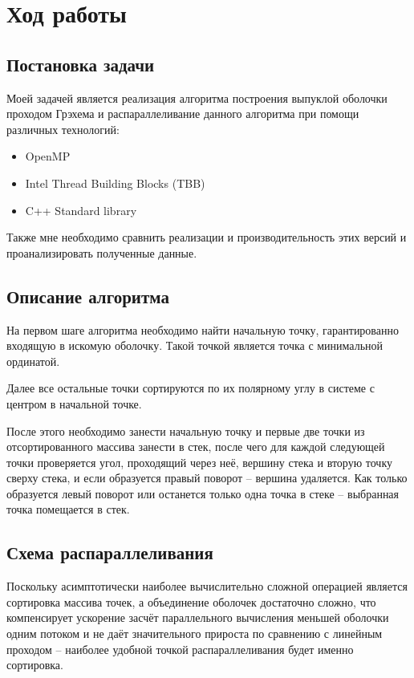 \documentclass[a4paper]{article}
\begin{document}
\section{Ход работы}
\subsection{Постановка задачи}

Моей задачей является реализация алгоритма построения выпуклой оболочки 
проходом Грэхема и распараллеливание данного алгоритма при помощи различных технологий:

\begin{itemize}
    \item OpenMP
    \item Intel Thread Building Blocks (TBB)
    \item C++ Standard library
\end{itemize}

Также мне необходимо сравнить реализации и производительность этих
версий и проанализировать полученные данные.

\subsection{Описание алгоритма}

На первом шаге алгоритма необходимо найти начальную точку, гарантированно входящую
в искомую оболочку. Такой точкой является точка с минимальной ординатой.

Далее все остальные точки сортируются по их полярному углу в системе с центром
в начальной точке. 

После этого необходимо занести начальную точку и первые две точки из отсортированного массива занести в стек, 
после чего для каждой следующей точки проверяется угол, проходящий через неё, вершину стека и вторую точку сверху стека, и если 
образуется правый поворот -- вершина удаляется. Как только образуется левый поворот или останется только одна точка в стеке --
выбранная точка помещается в стек. 

\subsection{Схема распараллеливания}

Поскольку асимптотически наиболее вычислительно сложной операцией является сортировка массива точек,
а объединение оболочек достаточно сложно, что компенсирует ускорение засчёт параллельного вычисления 
меньшей оболочки одним потоком и не даёт значительного прироста по сравнению с линейным проходом -- 
наиболее удобной точкой распараллеливания будет именно сортировка.
\end{document}
